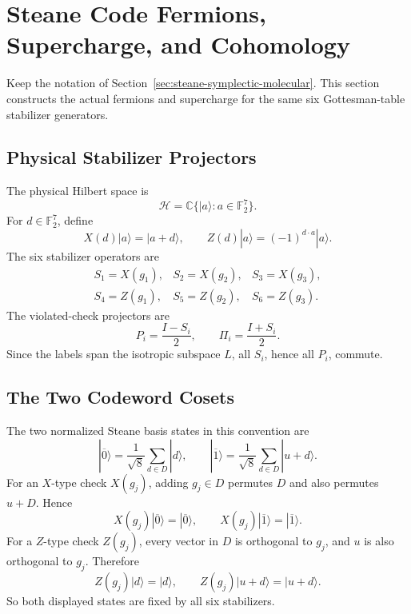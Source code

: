 
\section{Steane Code Fermions, Supercharge, and Cohomology}
\label{sec:steane-supercharge-cohomology}

Keep the notation of Section~\ref{sec:steane-symplectic-molecular}. This
section constructs the actual fermions and supercharge for the same six
Gottesman-table stabilizer generators.

\subsection{Physical Stabilizer Projectors}

The physical Hilbert space is
\[
  \mathcal H=\mathbb C\{|a\rangle:a\in\mathbb F_2^7\}.
\]
For \(d\in\mathbb F_2^7\), define
\[
  X(d)|a\rangle=|a+d\rangle,\qquad
  Z(d)|a\rangle=(-1)^{d\cdot a}|a\rangle .
\]
The six stabilizer operators are
\[
\begin{array}{lll}
S_1=X(g_1),&S_2=X(g_2),&S_3=X(g_3),\\
S_4=Z(g_1),&S_5=Z(g_2),&S_6=Z(g_3).
\end{array}
\]
The violated-check projectors are
\[
  P_i=\frac{I-S_i}{2},\qquad
  \Pi_i=\frac{I+S_i}{2}.
\]
Since the labels span the isotropic subspace \(L\), all \(S_i\), hence all
\(P_i\), commute.

\subsection{The Two Codeword Cosets}

The two normalized Steane basis states in this convention are
\[
  |\overline0\rangle
  =
  \frac1{\sqrt8}\sum_{d\in D}|d\rangle,
  \qquad
  |\overline1\rangle
  =
  \frac1{\sqrt8}\sum_{d\in D}|u+d\rangle .
\]
For an \(X\)-type check \(X(g_j)\), adding \(g_j\in D\) permutes \(D\) and also
permutes \(u+D\). Hence
\[
  X(g_j)|\overline0\rangle=|\overline0\rangle,\qquad
  X(g_j)|\overline1\rangle=|\overline1\rangle .
\]
For a \(Z\)-type check \(Z(g_j)\), every vector in \(D\) is orthogonal to
\(g_j\), and \(u\) is also orthogonal to \(g_j\). Therefore
\[
  Z(g_j)|d\rangle=|d\rangle,\qquad
  Z(g_j)|u+d\rangle=|u+d\rangle .
\]
So both displayed states are fixed by all six stabilizers.

